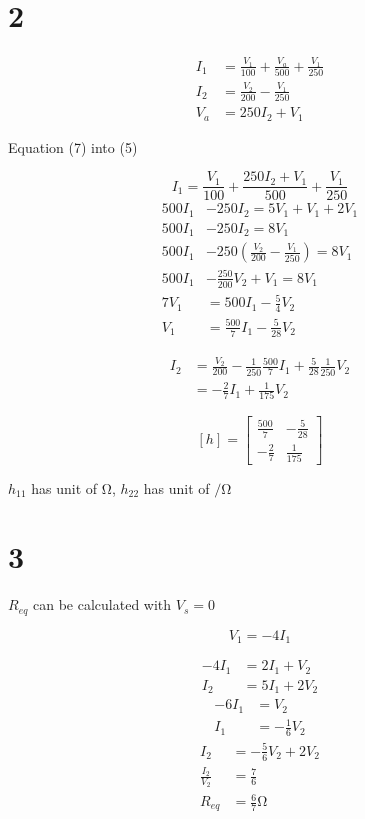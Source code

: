 \documentclass{article}
\begin{document}
\begin{multicols}{2}
\section*{2}
\begin{align}
    I_1 &= \frac{V_1}{100} + \frac{V_a}{500} + \frac{V_1}{250}\\
    I_2 &= \frac{V_2}{200} - \frac{V_1}{250}\\
    V_a &= 250 I_2 + V_1
\end{align}

Equation (7) into (5)

\begin{equation}
    I_1 = \frac{V_1}{100} + \frac{250 I_2 + V_1}{500} + \frac{V_1}{250}
\end{equation}
\begin{align*}
    500 I_1 &- 250 I_2 = 5 V_1 + V_1 + 2 V_1\\
    500 I_1 &- 250 I_2 = 8 V_1 \\
    500 I_1 &- 250 \left( \frac{V_2}{200} - \frac{V_1}{250} \right) = 8 V_1\\
    500 I_1 &- \frac{250}{200} V_2 + V_1 = 8 V_1\\
    7V_1 &= 500 I_1 - \frac{5}{4}V_2\\
    V_1 &= \frac{500}{7} I_1 - \frac{5}{28} V_2
\end{align*}

\begin{align*}
    I_2 &= \frac{V_2}{200} - \frac{1}{250} \frac{500}{7} I_1 + \frac{5}{28}\frac{1}{250} V_2\\
    &= -\frac{2}{7} I_1 + \frac{1}{175} V_2
\end{align*}

$$
  [h] = 
  \begin{bmatrix}
  \frac{500}{7} & -\frac{5}{28}\\
  -\frac{2}{7} & \frac{1}{175}
  \end{bmatrix}
$$

$h_{11}$ has unit of $\si{\ohm}$, $h_{22}$ has unit of $\si{\per\ohm}$

\section*{3}
$R_{eq}$ can be calculated with $V_s = 0$

$$
    V_1 = -4 I_1
$$

\begin{align}
    -4 I_1 &= 2 I_1 + V_2\\
    I_2 &= 5 I_1 + 2 V_2
\end{align}
\begin{align*}
    -6 I_1 &= V_2\\
    I_1 &= -\frac{1}{6} V_2
\end{align*}
\begin{align*}
    I_2 &= -\frac{5}{6} V_2 + 2 V_2\\
    \frac{I_2}{V_2} &= \frac{7}{6}\\
    R_{eq} &= \frac{6}{7}\si{\ohm}
\end{align*}


\end{multicols}
\end{document}
